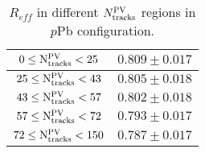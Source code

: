 \begin{table}[H]
\centering
\caption{$R_{eff}$ in different $N_{\rm tracks}^{\rm PV}$ regions in $p$Pb configuration.}
\begin{center}
\begin{tabular}{c|c}
\hline
$0 \leq \mathrm{N_{\rm tracks}^{\rm PV}} < 25$ & $0.809 \pm 0.017$ \\
\hline
$25 \leq \mathrm{N_{\rm tracks}^{\rm PV}} < 43$ & $0.805 \pm 0.018$ \\
\hline
$43 \leq \mathrm{N_{\rm tracks}^{\rm PV}} < 57$ & $0.802 \pm 0.018$ \\
\hline
$57 \leq \mathrm{N_{\rm tracks}^{\rm PV}} < 72$ & $0.793 \pm 0.017$ \\
\hline
$72 \leq \mathrm{N_{\rm tracks}^{\rm PV}} < 150$ & $0.787 \pm 0.017$ \\
\hline
\end{tabular}
\end{center}
\label{ReffTable_Nfor_pPb}
\end{table}
